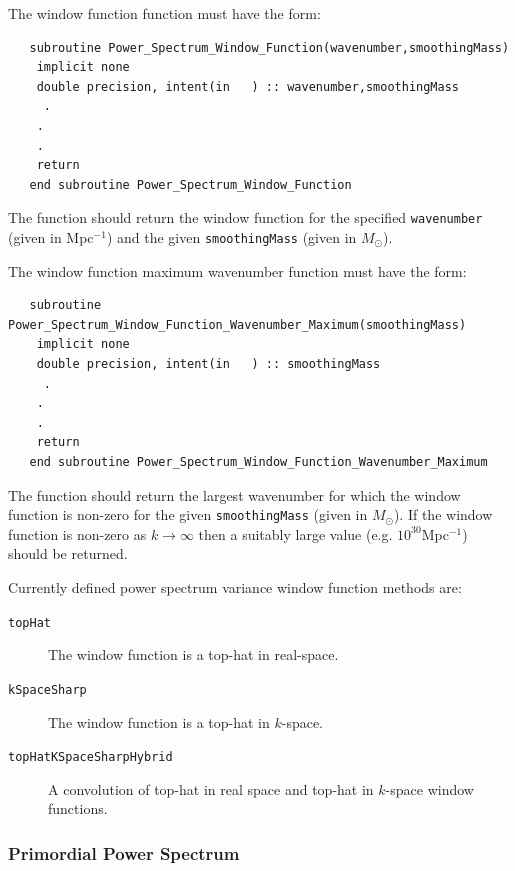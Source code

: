 The window function function must have the form:
\begin{verbatim}
   subroutine Power_Spectrum_Window_Function(wavenumber,smoothingMass)
    implicit none
    double precision, intent(in   ) :: wavenumber,smoothingMass
     .
    .
    .
    return
   end subroutine Power_Spectrum_Window_Function
\end{verbatim}
The function should return the window function for the specified {\tt wavenumber} (given in Mpc$^{-1}$) and the given {\tt smoothingMass} (given in $M_\odot$).

The window function maximum wavenumber function must have the form:
\begin{verbatim}
   subroutine Power_Spectrum_Window_Function_Wavenumber_Maximum(smoothingMass)
    implicit none
    double precision, intent(in   ) :: smoothingMass
     .
    .
    .
    return
   end subroutine Power_Spectrum_Window_Function_Wavenumber_Maximum
\end{verbatim}
The function should return the largest wavenumber for which the window function is non-zero for the given {\tt smoothingMass} (given in $M_\odot$). If the window function is non-zero as $k\rightarrow\infty$ then a suitably large value (e.g. $10^{30}$Mpc$^{-1}$) should be returned.

Currently defined power spectrum variance window function methods are:
\begin{description}
 \item [{\tt topHat}] The window function is a top-hat in real-space.
 \item [{\tt kSpaceSharp}] The window function is a top-hat in $k$-space.
 \item [{\tt topHatKSpaceSharpHybrid}] A convolution of top-hat in real space and top-hat in $k$-space window functions.
\end{description}

\subsubsection{Primordial Power Spectrum}

